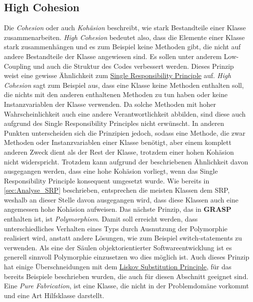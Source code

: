 \subsection{High Cohesion}
Die \textit{Cohesion} oder auch \textit{Kohäsion} beschreibt, wie stark Bestandteile einer Klasse zusammenarbeiten.
\textit{High Cohesion} bedeutet also, dass die Elemente einer Klasse stark zusammenhängen und es zum Beispiel keine Methoden gibt, die nicht auf andere Bestandteile der Klasse angewiesen sind.
Es sollen unter anderem Low-Coupling und auch die Struktur des Codes verbessert werden.
Dieses Prinzip weist eine gewisse Ähnlichkeit zum \hyperref[sec:SRP]{Single Responsibility Principle} auf.
\textit{High Cohesion} sagt zum Beispiel aus, dass eine Klasse keine Methoden enthalten soll, die nichts mit den anderen enthaltenen Methoden zu tun haben oder keine Instanzvariablen der Klasse verwenden. 
Da solche Methoden mit hoher Wahrscheinlichkeit auch eine andere Verantwortlichkeit abbilden, sind diese auch aufgrund des Single Responsibility Principles nicht erwünscht.
In anderen Punkten unterscheiden sich die Prinzipien jedoch, sodass eine Methode, die zwar Methoden oder Instanzvariablen einer Klasse benötigt, aber einem komplett anderen Zweck dient als der Rest der Klasse, trotzdem einer hohen Kohäsion nicht widerspricht.
\newline
Trotzdem kann aufgrund der beschriebenen Ähnlichkeit davon ausgegangen werden, dass eine hohe Kohäsion vorliegt, wenn das Single Responsibility Principle konsequent umgesetzt wurde.
Wie bereits in \ref{sec:Analyse_SRP} beschrieben, entsprechen die meisten Klassen dem SRP, weshalb an dieser Stelle davon ausgegangen wird, dass diese Klassen auch eine angemessen hohe Kohäsion aufweisen.
\newline
\newline
Das nächste Prinzip, das in \textbf{GRASP} enthalten ist, ist \textit{Polymorphism}.
Damit soll erreicht werden, dass unterschiedliches Verhalten eines Typs durch Ausnutzung der Polymorphie realisiert wird, anstatt andere Lösungen, wie zum Beispiel switch-statements zu verwenden.
Als eine der Säulen objektorientierter Softwareentwicklung ist es generell sinnvoll Polymorphie einzusetzen wo dies möglich ist.
Auch dieses Prinzip hat einige Überschneidungen mit dem \hyperref[sec:LSP]{Liskov Substitution Principle}, für das bereits Beispiele beschrieben wurden, die auch für diesen Abschnitt geeignet sind.
\newline
\newline
Eine \textit{Pure Fabrication}, ist eine Klasse, die nicht in der Problemdomäne vorkommt und eine Art Hilfsklasse darstellt.
